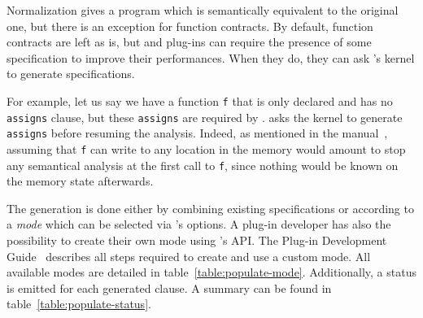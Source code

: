 Normalization gives a program which is semantically equivalent to the original
one, but there is an exception for function contracts. By default, function
contracts are left as is, but \FramaC and plug-ins can require the presence of
some specification to improve their performances. When they do, they can ask
\FramaC's kernel to generate specifications.

For example, let us say we have a function \texttt{f} that is only declared and
has no \acsl \texttt{assigns} clause, but these \texttt{assigns} are required by
\Eva. \Eva asks the kernel to generate \texttt{assigns} before resuming
the analysis. Indeed, as mentioned in the \acsl manual~\cite{acsl}, assuming
that \texttt{f} can write to any location in the memory would amount to stop any
semantical analysis at the first call to \texttt{f}, since nothing would be
known on the memory state afterwards.

The generation is done either by combining existing specifications or according
to a \emph{mode} which can be selected via \FramaC's options. A plug-in
developer has also the possibility to create their own mode using \FramaC's API.
The Plug-in Development Guide~\cite{plugin-dev-guide} describes all steps
required to create and use a custom mode. All available modes are detailed in
table~\ref{table:populate-mode}. Additionally, a status is emitted for each
generated clause. A summary can be found in table~\ref{table:populate-status}.


